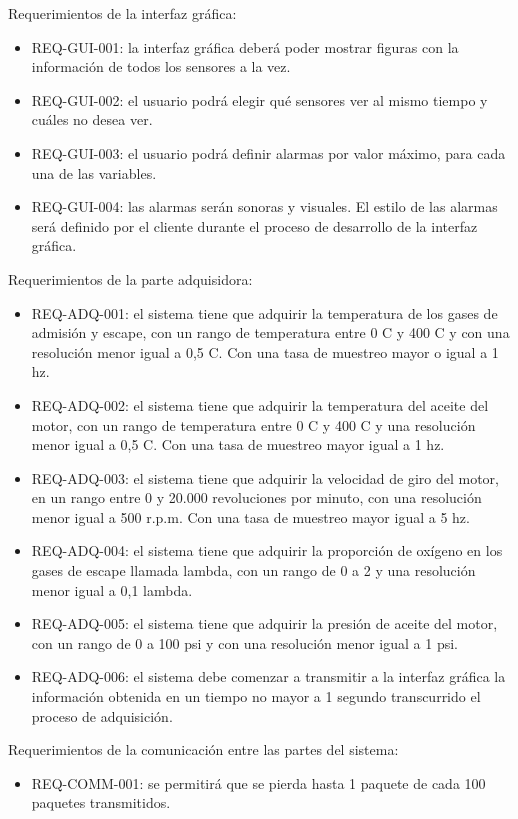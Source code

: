 Requerimientos de la interfaz gráfica:
\begin{itemize}
\item REQ-GUI-001: la interfaz gráfica deberá poder mostrar figuras con la información de todos los sensores a la vez.
\item REQ-GUI-002: el usuario podrá elegir qué sensores ver al mismo tiempo y cuáles no desea ver.
\item REQ-GUI-003: el usuario podrá definir alarmas por valor máximo, para cada una de las variables.
\item REQ-GUI-004: las alarmas serán sonoras y visuales. El estilo de las alarmas será definido por el cliente durante el proceso de desarrollo de la interfaz gráfica.
\end{itemize}

Requerimientos de la parte adquisidora:
\begin{itemize}
\item REQ-ADQ-001: el sistema tiene que adquirir la temperatura de los gases de admisión y escape, con un rango de temperatura entre 0 \degree C y 400 \degree C y con una resolución menor igual a 0,5 \degree C. Con una tasa de muestreo mayor o igual a 1 hz.
\item REQ-ADQ-002: el sistema tiene que adquirir la temperatura del aceite del motor, con un rango de temperatura entre 0 \degree C y 400 \degree C y una resolución menor igual a 0,5 \degree C. Con una tasa de muestreo mayor igual a 1 hz.
\item REQ-ADQ-003: el sistema tiene que adquirir la velocidad de giro del motor, en un rango entre 0 y 20.000 revoluciones por minuto, con una resolución menor igual a 500 r.p.m. Con una tasa de muestreo mayor igual a 5 hz.
\item REQ-ADQ-004: el sistema tiene que adquirir la proporción de oxígeno en los gases de escape llamada lambda, con un rango de 0 a 2 y una resolución menor igual a 0,1 lambda.
\item REQ-ADQ-005: el sistema tiene que adquirir la presión de aceite del motor, con un rango de 0 a 100 psi y con una resolución menor igual a 1 psi.
\item REQ-ADQ-006: el sistema debe comenzar a transmitir a la interfaz gráfica la información obtenida en un tiempo no mayor a 1 segundo transcurrido el proceso de adquisición.
\end{itemize}

Requerimientos de la comunicación entre las partes del sistema:
\begin{itemize}
\item REQ-COMM-001: se permitirá que se pierda hasta 1 paquete de cada 100 paquetes transmitidos.
\end{itemize}

